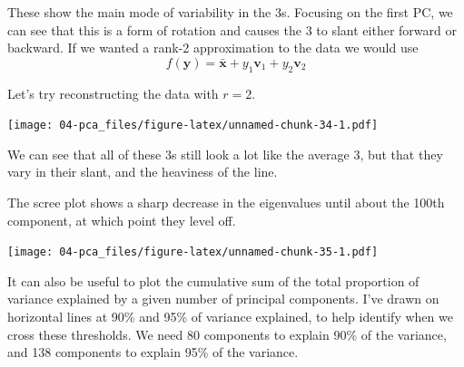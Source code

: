 \documentclass[
]{book}
\newenvironment{Shaded}{\begin{snugshade}}{\end{snugshade}}
\newcommand{\AttributeTok}[1]{\textcolor[rgb]{0.13,0.29,0.53}{#1}}
\newcommand{\CommentTok}[1]{\textcolor[rgb]{0.56,0.35,0.01}{\textit{#1}}}
\newcommand{\DecValTok}[1]{\textcolor[rgb]{0.00,0.00,0.81}{#1}}
\newcommand{\FunctionTok}[1]{\textcolor[rgb]{0.13,0.29,0.53}{\textbf{#1}}}
\newcommand{\NormalTok}[1]{#1}
\newcommand{\OtherTok}[1]{\textcolor[rgb]{0.56,0.35,0.01}{#1}}
\newcommand{\SpecialCharTok}[1]{\textcolor[rgb]{0.81,0.36,0.00}{\textbf{#1}}}
\theoremstyle{definition}
\theoremstyle{definition}
\theoremstyle{definition}
\theoremstyle{definition}
\theoremstyle{remark}
\begin{document}
These show the main mode of variability in the 3s. Focusing on the first PC, we can see that this is a form of rotation and causes the 3 to slant either forward or backward. If we wanted a rank-2 approximation to the data we would use
\[f(\mathbf y) = \bar{\mathbf x} + y_1 \mathbf v_1 + y_2 \mathbf v_2\]

Let's try reconstructing the data with \(r=2\).

\begin{Shaded}
\end{Shaded}

\texttt{[image: 04-pca\_files/figure-latex/unnamed-chunk-34-1.pdf]}

We can see that all of these 3s still look a lot like the average 3, but that they vary in their slant, and the heaviness of the line.

The scree plot shows a sharp decrease in the eigenvalues until about the 100th component, at which point they level off.

\begin{Shaded}
\end{Shaded}

\texttt{[image: 04-pca\_files/figure-latex/unnamed-chunk-35-1.pdf]}

It can also be useful to plot the cumulative sum of the total proportion of variance explained by a given number of principal components. I've drawn on horizontal lines at 90\% and 95\% of variance explained, to help identify when we cross these thresholds.
We need 80 components to explain 90\% of the variance, and 138 components to explain 95\% of the variance.
\end{document}

